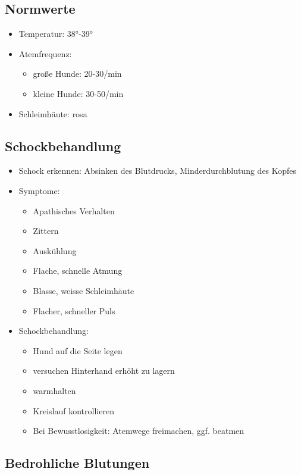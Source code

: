     \subsection{Normwerte}
    \begin{itemize}
        \item Temperatur: 38°-39°
        \item Atemfrequenz:
        \begin{itemize}
            \item große Hunde: 20-30/min
            \item kleine Hunde: 30-50/min
        \end{itemize}
        \item Schleimhäute: rosa
    \end{itemize}

    \subsection{Schockbehandlung}
        \begin{itemize}
            \item Schock erkennen: Absinken des Blutdrucks, Minderdurchblutung des Kopfes
            \item Symptome:
            \begin{itemize}
                \item Apathisches Verhalten
                \item Zittern
                \item Auskühlung
                \item Flache, schnelle Atmung
                \item Blasse, weisse Schleimhäute
                \item Flacher, schneller Puls
            \end{itemize}
            \item Schockbehandlung:
            \begin{itemize}
                \item Hund auf die Seite legen
                \item versuchen Hinterhand erhöht zu lagern
                \item warmhalten
                \item Kreislauf kontrollieren
                \item Bei Bewusstlosigkeit: Atemwege freimachen, ggf. beatmen
            \end{itemize}
        \end{itemize}

    \subsection{Bedrohliche Blutungen}